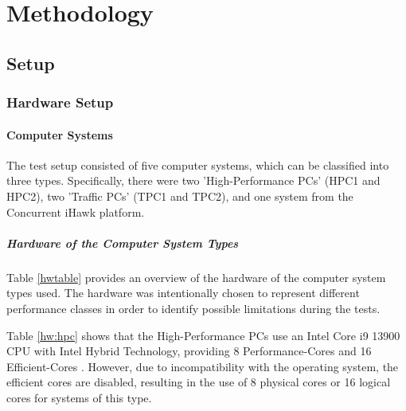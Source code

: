 \chapter{Methodology}

\section{Setup}
\subsection{Hardware Setup}

\subsubsection{Computer Systems}
The test setup consisted of five computer systems, which can be classified into three types.  Specifically, there were two 'High-Performance PCs' (HPC1 and HPC2), two 'Traffic PCs' (TPC1 and TPC2), and one system from the Concurrent iHawk platform.

\paragraph{Hardware of the Computer System Types} \label{chap:ComputerHardware}
Table \ref{hwtable} provides an overview of the hardware of the computer system types used. The hardware was intentionally chosen to represent different performance classes in order to identify possible limitations during the tests.

Table \ref{hw:hpc} shows that the High-Performance PCs use an Intel Core i9 13900 \ac{CPU} with Intel Hybrid Technology, providing 8 Performance-Cores and 16 Efficient-Cores \cite{setup10}. However, due to incompatibility with the operating system, the efficient cores are disabled, resulting in the use of 8 physical cores or 16 logical cores for systems of this type.


